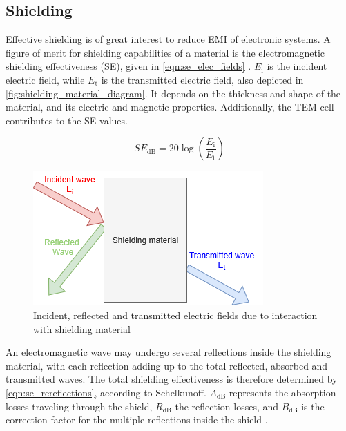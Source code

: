 \subsection{Shielding}

Effective shielding is of great interest to reduce EMI of electronic systems. A figure of merit for shielding capabilities of a material is the electromagnetic shielding effectiveness (SE), given in \autoref{eqn:se_elec_fields} \cite{10518640}. $E_\mathrm{i}$ is the incident electric field, while $E_\mathrm{t}$ is the transmitted electric field, also depicted in \autoref{fig:shielding_material_diagram}. It depends on the thickness and shape of the material, and its electric and magnetic properties. Additionally, the TEM cell contributes to the SE values.


\begin{equation}
    SE_{\mathrm{dB}}=20\log{(\frac{E_\mathrm{i}}{E_\mathrm{t}})}
    \label{eqn:se_elec_fields}
\end{equation}

\begin{figure}[h]
    \centering
    \includegraphics[width=0.35\linewidth]{images/shielding_material_diagram.png}
    \caption{Incident, reflected and transmitted electric fields due to interaction with shielding material}
    \label{fig:shielding_material_diagram}
\end{figure}


An electromagnetic wave may undergo several reflections inside the shielding material, with each reflection adding up to the total reflected, absorbed and transmitted waves. The total shielding effectiveness is therefore determined by \autoref{eqn:se_rereflections}, according to Schelkunoff. $A_{\mathrm{dB}}$ represents the absorption losses traveling through the shield, $R_{\mathrm{dB}}$ the reflection losses, and $B_{\mathrm{dB}}$ is the correction factor for the multiple reflections inside the shield \cite{10518640}.

